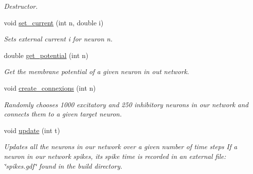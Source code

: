 \begin{DoxyCompactItemize}
\begin{DoxyCompactList}\small\item\em Destructor. \end{DoxyCompactList}\item 
void \hyperlink{classNetwork_ad0efa7f34a8da1a772495ef9049d8eef}{set\-\_\-current} (int n, double i)
\begin{DoxyCompactList}\small\item\em Sets external current i for neuron n. \end{DoxyCompactList}\item 
double \hyperlink{classNetwork_ade8ce5516ec390a0068ba6bb6e3b944d}{get\-\_\-potential} (int n)
\begin{DoxyCompactList}\small\item\em Get the membrane potential of a given neuron in out network. \end{DoxyCompactList}\item 
void \hyperlink{classNetwork_afc6426636611ba2694b6d7c631d02f41}{create\-\_\-connexions} (int n)
\begin{DoxyCompactList}\small\item\em Randomly chooses 1000 excitatory and 250 inhibitory neurons in our network and connects them to a given target neuron. \end{DoxyCompactList}\item 
void \hyperlink{classNetwork_a402228b86fbabdb3394ab21c9c8d4b30}{update} (int t)
\begin{DoxyCompactList}\small\item\em Updates all the neurons in our network over a given number of time steps If a neuron in our network spikes, its spike time is recorded in an external file\-: \char`\"{}spikes.\-gdf\char`\"{} found in the build directory. \end{DoxyCompactList}\end{DoxyCompactItemize}
